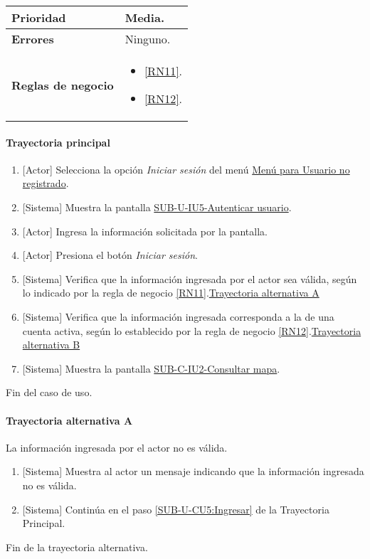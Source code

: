 \begin{longtable}{|J{5cm}|J{10.3cm}|}
		\\ \hline 
	\textbf{Prioridad} & 
		Media. \\ \hline
	\textbf{Errores} & Ninguno.
		\\ \hline
	\textbf{Reglas de negocio} & 
		\begin{itemize}
			\item \ref{RN11}.
			\item \ref{RN12}.
		\end{itemize}
		 \\ \hline
\end{longtable}

\paragraph{Trayectoria principal}
	\begin{enumerate}
		\item {[Actor]} Selecciona la opción \textit{Iniciar sesión} del menú \hyperref[fig:menu-usuario]{Menú para Usuario no registrado}.
		\item  {[Sistema]} Muestra la pantalla \hyperref[fig:sub-u-iu5]{SUB-U-IU5-Autenticar usuario}.
		\item \label{SUB-U-CU5:Ingresar} {[Actor]} Ingresa la información solicitada por la pantalla.
		\item \label{SUB-U-CU5:PresionaBoton} {[Actor]} Presiona el botón \textit{Iniciar sesión}.
		\item {[Sistema]} Verifica que la información ingresada por el actor sea válida, según lo indicado por la regla de negocio \ref{RN11}.\hyperref[SUB-U-CU5:TA]{Trayectoria alternativa A}
		\item {[Sistema]} Verifica que la información ingresada corresponda a la de una cuenta activa, según lo establecido por la regla de negocio \ref{RN12}.\hyperref[SUB-U-CU5:TB]{Trayectoria alternativa B}
		\item \label{SUB-U-CU5:Pantalla} {[Sistema]} Muestra la pantalla \hyperref[fig:sub-c-iu2]{SUB-C-IU2-Consultar mapa}.
	\end{enumerate}
	Fin del caso de uso.

\paragraph{Trayectoria alternativa A} \label{SUB-U-CU5:TA}
	La información ingresada por el actor no es válida.
	\begin{enumerate}[label=A\arabic*.]
		\item {[Sistema]} Muestra al actor un mensaje indicando que la información ingresada no es válida.
		\item {[Sistema]} Continúa en el paso \ref{SUB-U-CU5:Ingresar} de la Trayectoria Principal.
	\end{enumerate}
	Fin de la trayectoria alternativa.

